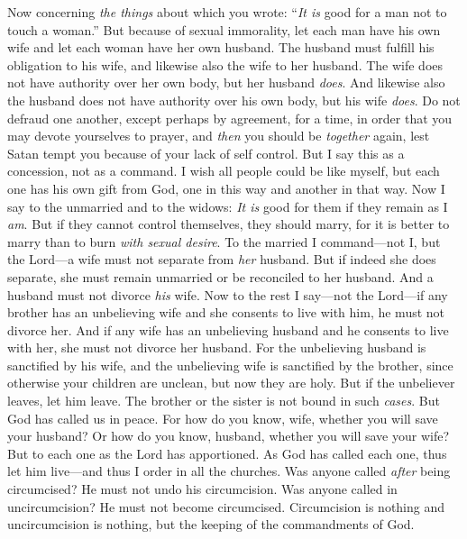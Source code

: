 \begin{biblechapter} %
 Now concerning \textit{the things} about which you wrote: “\textit{It is} good for a man not to touch a woman.”
\verse But because of sexual immorality, let each man have his own wife and let each woman have her own husband.
\verse The husband must fulfill his obligation to his wife, and likewise also the wife to her husband.
\verse The wife does not have authority over her own body, but her husband \textit{does}. And likewise also the husband does not have authority over his own body, but his wife \textit{does}.
\verse Do not defraud one another, except perhaps by agreement, for a time, in order that you may devote yourselves to prayer, and \textit{then} you should be \textit{together} again, lest Satan tempt you because of your lack of self control.
\verse But I say this as a concession, not as a command.
\verse I wish all people could be like myself, but each one has his own gift from God, one in this way and another in that way.
\verse Now I say to the unmarried and to the widows: \textit{It is} good for them if they remain as I \textit{am}.
\verse But if they cannot control themselves, they should marry, for it is better to marry than to burn \textit{with sexual desire}.
\verse To the married I command—not I, but the Lord—a wife must not separate from \textit{her} husband.
\verse But if indeed she does separate, she must remain unmarried or be reconciled to her husband. And a husband must not divorce \textit{his} wife.
\verse Now to the rest I say—not the Lord—if any brother has an unbelieving wife and she consents to live with him, he must not divorce her.
\verse And if any wife has an unbelieving husband and he consents to live with her, she must not divorce her husband.
\verse For the unbelieving husband is sanctified by his wife, and the unbelieving wife is sanctified by the brother, since otherwise your children are unclean, but now they are holy.
\verse But if the unbeliever leaves, let him leave. The brother or the sister is not bound in such \textit{cases}. But God has called us in peace.
\verse For how do you know, wife, whether you will save your husband? Or how do you know, husband, whether you will save your wife?
\verse But to each one as the Lord has apportioned. As God has called each one, thus let him live—and thus I order in all the churches.
\verse Was anyone called \textit{after} being circumcised? He must not undo his circumcision. Was anyone called in uncircumcision? He must not become circumcised.
\verse Circumcision is nothing and uncircumcision is nothing, but the keeping of the commandments of God.

\end{biblechapter}
